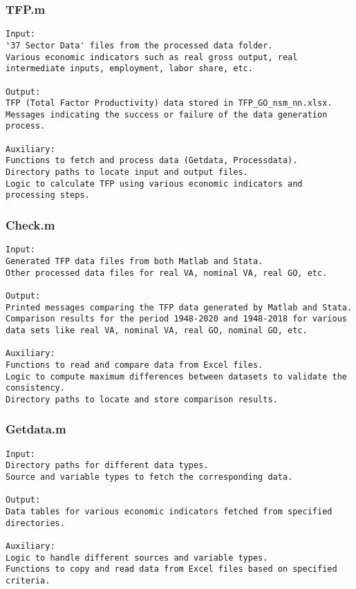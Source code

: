 \documentclass[11pt]{article}
\theoremstyle{definition}
\newcommand{\codepath}{F:/12004835/replication_package_final/replication_package_final}
\begin{document}
	\subsubsection{TFP.m}
	\begin{lstlisting}[style=Matlab]
Input:
'37 Sector Data' files from the processed data folder.
Various economic indicators such as real gross output, real intermediate inputs, employment, labor share, etc.

Output:
TFP (Total Factor Productivity) data stored in TFP_GO_nsm_nn.xlsx.
Messages indicating the success or failure of the data generation process.

Auxiliary:
Functions to fetch and process data (Getdata, Processdata).
Directory paths to locate input and output files.
Logic to calculate TFP using various economic indicators and processing steps.
	\end{lstlisting}
	
	
	
	\subsubsection{Check.m}
	\begin{lstlisting}[style=Matlab]
Input:
Generated TFP data files from both Matlab and Stata.
Other processed data files for real VA, nominal VA, real GO, etc.

Output:
Printed messages comparing the TFP data generated by Matlab and Stata.
Comparison results for the period 1948-2020 and 1948-2018 for various data sets like real VA, nominal VA, real GO, nominal GO, etc.

Auxiliary:
Functions to read and compare data from Excel files.
Logic to compute maximum differences between datasets to validate the consistency.
Directory paths to locate and store comparison results.
	\end{lstlisting}
	
	
	
	\subsubsection{Getdata.m}
	\begin{lstlisting}[style=Matlab]
Input:
Directory paths for different data types.
Source and variable types to fetch the corresponding data.

Output:
Data tables for various economic indicators fetched from specified directories.

Auxiliary:
Logic to handle different sources and variable types.
Functions to copy and read data from Excel files based on specified criteria.
	\end{lstlisting}
	
	
\end{document}
